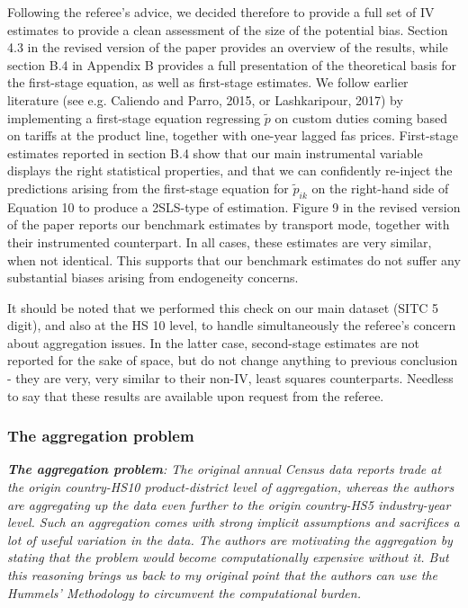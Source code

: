 \documentclass[a4paper,11pt]{article}
\begin{document}
Following the referee's advice, we decided therefore to provide a full set of IV estimates to provide a clean assessment of the size of the potential bias. Section 4.3 in the revised version of the paper provides an overview of the results, while section B.4 in Appendix B provides a full presentation of the theoretical basis for the first-stage equation, as well as first-stage estimates. We follow earlier literature (see e.g. Caliendo and Parro, 2015, or Lashkaripour, 2017) by implementing a first-stage equation regressing $\widetilde{p}$ on custom duties coming based on tariffs at the product line, together with one-year lagged fas prices. First-stage estimates reported in section B.4 show that our main instrumental variable displays the right statistical properties, and that we can confidently re-inject the predictions arising from the first-stage equation for $\widetilde{p}_{ik}$ on the right-hand side of Equation 10 to produce a 2SLS-type of estimation. Figure 9 in the revised version of the paper reports our benchmark estimates by transport mode, together with their instrumented counterpart. In all cases, these estimates are very similar, when not identical. This supports that our benchmark estimates do not suffer any substantial biases arising from endogeneity concerns.

It should be noted that we performed this check on our main dataset (SITC 5 digit), and also at the HS 10 level, to handle simultaneously the referee's concern about aggregation issues. In the latter case, second-stage estimates are not reported for the sake of space, but do not change anything to previous conclusion - they are very, very similar to their non-IV, least squares counterparts. Needless to say that these results are available upon request from the referee.


\subsubsection{The aggregation problem}

\textit{\textbf{The aggregation problem}: The original annual Census data reports
trade at the origin country-HS10 product-district level of aggregation,
whereas the authors are aggregating up the data even further to the origin
country-HS5 industry-year level. Such an aggregation comes with strong implicit assumptions and sacrifices a lot of useful variation in the data.
The authors are motivating the aggregation by stating that the problem
would become computationally expensive without it. But this reasoning
brings us back to my original point that the authors can use the Hummels'
Methodology to circumvent the computational burden.}
\end{document}
